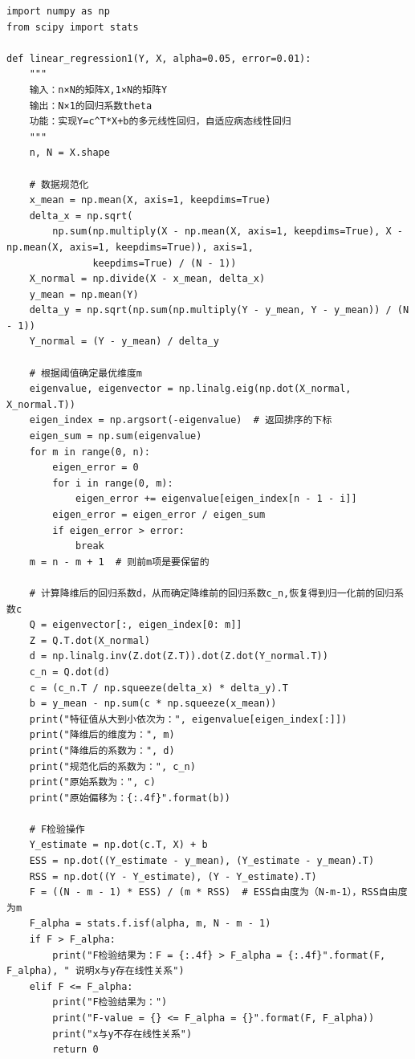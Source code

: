 \documentclass[UTF8]{ctexart}
\begin{document}
\begin{lstlisting}[style = python]
import numpy as np
from scipy import stats

def linear_regression1(Y, X, alpha=0.05, error=0.01):
    """
    输入：n×N的矩阵X,1×N的矩阵Y
    输出：N×1的回归系数theta
    功能：实现Y=c^T*X+b的多元线性回归，自适应病态线性回归
    """
    n, N = X.shape

    # 数据规范化
    x_mean = np.mean(X, axis=1, keepdims=True)
    delta_x = np.sqrt(
        np.sum(np.multiply(X - np.mean(X, axis=1, keepdims=True), X - np.mean(X, axis=1, keepdims=True)), axis=1,
               keepdims=True) / (N - 1))
    X_normal = np.divide(X - x_mean, delta_x)
    y_mean = np.mean(Y)
    delta_y = np.sqrt(np.sum(np.multiply(Y - y_mean, Y - y_mean)) / (N - 1))
    Y_normal = (Y - y_mean) / delta_y

    # 根据阈值确定最优维度m
    eigenvalue, eigenvector = np.linalg.eig(np.dot(X_normal, X_normal.T))
    eigen_index = np.argsort(-eigenvalue)  # 返回排序的下标
    eigen_sum = np.sum(eigenvalue)
    for m in range(0, n):
        eigen_error = 0
        for i in range(0, m):
            eigen_error += eigenvalue[eigen_index[n - 1 - i]]
        eigen_error = eigen_error / eigen_sum
        if eigen_error > error:
            break
    m = n - m + 1  # 则前m项是要保留的

    # 计算降维后的回归系数d，从而确定降维前的回归系数c_n,恢复得到归一化前的回归系数c
    Q = eigenvector[:, eigen_index[0: m]]
    Z = Q.T.dot(X_normal)
    d = np.linalg.inv(Z.dot(Z.T)).dot(Z.dot(Y_normal.T))
    c_n = Q.dot(d)
    c = (c_n.T / np.squeeze(delta_x) * delta_y).T
    b = y_mean - np.sum(c * np.squeeze(x_mean))
    print("特征值从大到小依次为：", eigenvalue[eigen_index[:]])
    print("降维后的维度为：", m)
    print("降维后的系数为：", d)
    print("规范化后的系数为：", c_n)
    print("原始系数为：", c)
    print("原始偏移为：{:.4f}".format(b))

    # F检验操作
    Y_estimate = np.dot(c.T, X) + b
    ESS = np.dot((Y_estimate - y_mean), (Y_estimate - y_mean).T)
    RSS = np.dot((Y - Y_estimate), (Y - Y_estimate).T)
    F = ((N - m - 1) * ESS) / (m * RSS)  # ESS自由度为（N-m-1），RSS自由度为m
    F_alpha = stats.f.isf(alpha, m, N - m - 1)
    if F > F_alpha:
        print("F检验结果为：F = {:.4f} > F_alpha = {:.4f}".format(F, F_alpha), " 说明x与y存在线性关系")
    elif F <= F_alpha:
        print("F检验结果为：")
        print("F-value = {} <= F_alpha = {}".format(F, F_alpha))
        print("x与y不存在线性关系")
        return 0


\end{lstlisting}
\end{document}
